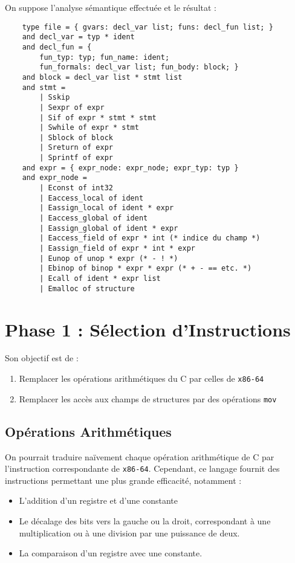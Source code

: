 \documentclass{cours}
\begin{document}
On suppose l'analyse sémantique effectuée et le résultat : 
\begin{verbatim}
    type file = { gvars: decl_var list; funs: decl_fun list; }
    and decl_var = typ * ident
    and decl_fun = {
        fun_typ: typ; fun_name: ident;
        fun_formals: decl_var list; fun_body: block; }
    and block = decl_var list * stmt list
    and stmt =
        | Sskip
        | Sexpr of expr
        | Sif of expr * stmt * stmt
        | Swhile of expr * stmt
        | Sblock of block
        | Sreturn of expr
        | Sprintf of expr
    and expr = { expr_node: expr_node; expr_typ: typ }
    and expr_node =
        | Econst of int32
        | Eaccess_local of ident
        | Eassign_local of ident * expr
        | Eaccess_global of ident
        | Eassign_global of ident * expr
        | Eaccess_field of expr * int (* indice du champ *)
        | Eassign_field of expr * int * expr
        | Eunop of unop * expr (* - ! *)
        | Ebinop of binop * expr * expr (* + - == etc. *)
        | Ecall of ident * expr list
        | Emalloc of structure
\end{verbatim}

\section{Phase 1 : Sélection d'Instructions}
Son objectif est de : 
\begin{enumerate}
    \item Remplacer les opérations arithmétiques du C par celles de \texttt{x86-64}
    \item Remplacer les accès aux champs de structures par des opérations \texttt{mov}
\end{enumerate}
\subsection{Opérations Arithmétiques}
On pourrait traduire naïvement chaque opération arithmétique de C par l'instruction correspondante de \texttt{x86-64}. Cependant, ce langage fournit des instructions permettant une plus grande efficacité, notamment : 
\begin{itemize}
    \item L'addition d'un registre et d'une constante
    \item Le décalage des bits vers la gauche ou la droit, correspondant à une multiplication ou à une division par une puissance de deux. 
    \item La comparaison d'un registre avec une constante. 
\end{itemize}
\end{document}
